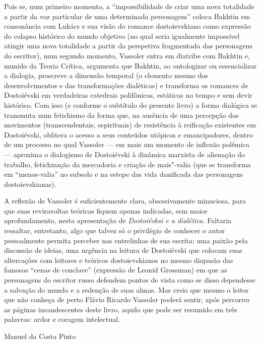 Pois se, num primeiro momento, a ``impossibilidade de criar uma nova
totalidade a partir da voz particular de uma determinada personagem''
coloca Bakhtin em consonância com Lukács e sua visão do romance
dostoievskiano como expressão do colapso histórico do mundo objetivo (no
qual seria igualmente impossível atingir uma nova totalidade a partir da
perspetiva fragmentada das personagens do escritor), num segundo
momento, Vassoler entra em diatribe com Bakhtin e, munido da Teoria
Crítica, argumenta que Bakhtin, ao ontologizar ou essencializar a
dialogia, proscreve a dimensão temporal (o elemento mesmo dos
desenvolvimentos e das transformações dialéticas) e transforma os
romances de Dostoiévski em verdadeiras catedrais polifônicas, estáticas
no tempo e sem devir histórico. Com isso (e conforme o subtítulo do
presente livro) a forma dialógica se transmuta num fetichismo da forma
que, na ausência de uma percepção dos movimentos (transcendentais,
espirituais) de resistência à reificação existentes em Dostoiévski,
oblitera o acesso a seus conteúdos utópicos e emancipadores, dentro de
um processo no qual Vassoler --- em mais um momento de inflexão polêmica
--- aproxima o dialogismo de Dostoiévski à dinâmica marxista de alienação
do trabalho, fetichização da mercadoria e criação de mais"-valia (que se
transforma em ``menos-valia'' no subsolo e na estepe das vida danificada
das personagens dostoievskianas).

A reflexão de Vassoler é suficientemente clara, obsessivamente
minuciosa, para que suas reviravoltas teóricas fiquem apenas indicadas,
sem maior aprofundamento, nesta apresentação de \emph{Dostoiévksi e a
dialética.} Faltaria ressaltar, entretanto, algo que talvez só o
privilégio de conhecer o autor pessoalmente permita perceber nas
entrelinhas de sua escrita: uma paixão pela discussão de ideias, uma
urgência na leitura de Dostoiévski que colocam suas altercações com
leitores e teóricos dostoievskianos no mesmo diapasão das famosas
``cenas de conclave'' (expressão de Leonid Grossman) em que as
personagens do escritor russo defendem pontos de vista como se disso
dependesse a salvação do mundo e a redenção de suas almas. Mas creio que
mesmo o leitor que não conheça de perto Flávio Ricardo Vassoler poderá
sentir, após percorrer as páginas incandescentes deste livro, aquilo que
pode ser resumido em três palavras: ardor e coragem intelectual.

\begin{flushright}
Manuel da Costa Pinto
\end{flushright}
